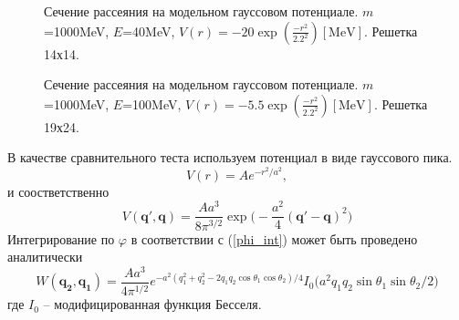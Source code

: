 \documentclass[a4paper,12pt]{article}
\newcommand{\vect}[1]{\boldsymbol{#1}}
\begin{document}
	\begin{figure}[h!]
  \caption{Сечение рассеяния на модельном гауссовом потенциале. $m$=1000MeV, $E$=40MeV, $V(r)=-20\exp(\frac{-r^2}{2.2^2}) [\text{MeV}]$. Решетка 14х14.}
  \label{fig:skatter11}
  \end{figure}
  
	\begin{figure}[h!]
  \caption{Сечение рассеяния на модельном гауссовом потенциале. $m$=1000MeV, $E$=100MeV, $V(r)=-5.5\exp(\frac{-r^2}{2.2^2}) [\text{MeV}]$. Решетка 19х24.}
  \label{fig:skatter12}
  \end{figure}
	
	В качестве сравнительного теста используем потенциал в виде гауссового пика.
	\begin{equation}
	   V(r) = A e^{-r^2/a^2},
	\end{equation}
	и соостветственно
	\begin{equation}
	   V(\vect{q'},\vect{q}) = \frac{Aa^3}{8\pi^{3/2}}\exp\big( - \frac{a^2}{4}(\vect{q'}-\vect{q})^2 \big)
	\end{equation}
	Интегрирование по $\varphi$ в соответствии с (\ref{phi_int}) может быть проведено аналитически
	\begin{equation}
	   W(\vect{q_2},\vect{q_1}) = \frac{Aa^3}{4\pi^{1/2}} e^{ - a^2( q_1^2 + q_2^2 - 2q_1q_2\cos\theta_1\cos\theta_2)/4 }
	    I_0 \big( a^2q_1q_2\sin\theta_1\sin\theta_2/2 \big)
	\end{equation}
	где $I_0$ -- модифицированная функция Бесселя.
	
\end{document}
